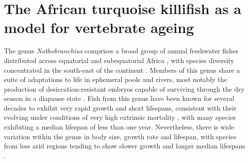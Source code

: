 %
%
%
%
%
\section{The African turquoise killifish as a model for vertebrate ageing}
%
%
%
The genus \textit{Nothobranchius} comprises a broad group of annual freshwater fishes distributed across equatorial and subequatorial Africa \parencite{valdesalici2003lifespan}, with species diversity concentrated in the south-east of the continent \parencite{genade2005annual}. Members of this genus share a suite of adaptations to life in ephemeral pools and rivers, most notably the production of desiccation-resistant embryos capable of surviving through the dry season in a diapause state \parencite{genade2005annual}. Fish from this genus have been known for several decades to  exhibit very rapid growth and short lifespans, consistent with their evolving under conditions of very high extrinsic mortality \parencite{valdesalici2003lifespan}, with many species exhibiting a median lifespan of less than one year. Nevertheless, there is wide variation within the genus in body size, growth rate and lifespan, with species from less arid regions tending to show slower growth and longer median lifespans \parencite{genade2005annual}.

